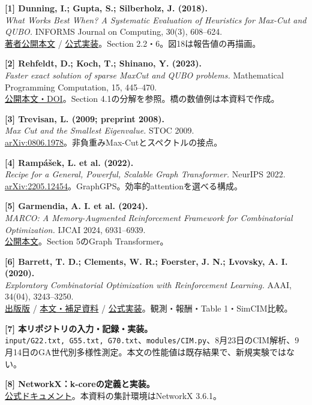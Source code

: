 \newpage
{}
{\small
\noindent\textbf{[1] Dunning, I.; Gupta, S.; Silberholz, J. (2018).}\\
\textit{What Works Best When? A Systematic Evaluation of Heuristics for Max-Cut and QUBO.} INFORMS Journal on Computing, 30(3), 608--624.\\
\href{https://raw.githubusercontent.com/MQLib/MQLib/master/paper/SECM_final.pdf}{著者公開本文} / \href{https://github.com/MQLib/MQLib}{公式実装}。Section 2.2・6。図18は報告値の再描画。

\noindent\textbf{[2] Rehfeldt, D.; Koch, T.; Shinano, Y. (2023).}\\
\textit{Faster exact solution of sparse MaxCut and QUBO problems.} Mathematical Programming Computation, 15, 445--470.\\
\href{https://doi.org/10.1007/s12532-023-00236-6}{公開本文・DOI}。Section 4.1の分解を参照。橋の数値例は本資料で作成。

\noindent\textbf{[3] Trevisan, L. (2009; preprint 2008).}\\
\textit{Max Cut and the Smallest Eigenvalue.} STOC 2009.\\
\href{https://arxiv.org/abs/0806.1978}{arXiv:0806.1978}。非負重みMax-Cutとスペクトルの接点。

\noindent\textbf{[4] Rampášek, L. et al. (2022).}\\
\textit{Recipe for a General, Powerful, Scalable Graph Transformer.} NeurIPS 2022.\\
\href{https://arxiv.org/abs/2205.12454}{arXiv:2205.12454}。GraphGPS。効率的attentionを選べる構成。

\noindent\textbf{[5] Garmendia, A. I. et al. (2024).}\\
\textit{MARCO: A Memory-Augmented Reinforcement Framework for Combinatorial Optimization.} IJCAI 2024, 6931--6939.\\
\href{https://www.ijcai.org/proceedings/2024/0766.pdf}{公開本文}。Section 5のGraph Transformer。

\noindent\textbf{[6] Barrett, T. D.; Clements, W. R.; Foerster, J. N.; Lvovsky, A. I. (2020).}\\
\textit{Exploratory Combinatorial Optimization with Reinforcement Learning.} AAAI, 34(04), 3243--3250.\\
\href{https://ojs.aaai.org/index.php/AAAI/article/view/5723}{出版版} / \href{https://arxiv.org/abs/1909.04063}{本文・補足資料} / \href{https://github.com/tomdbar/eco-dqn}{公式実装}。観測・報酬・Table 1・SimCIM比較。

\noindent\textbf{[7] 本リポジトリの入力・記録・実装。}\\
\texttt{input/G22.txt, G55.txt, G70.txt}、\texttt{modules/CIM.py}、8月23日のCIM解析、9月14日のGA世代別多様性測定。本文の性能値は既存結果で、新規実験ではない。

\noindent\textbf{[8] NetworkX：k-coreの定義と実装。}\\
\href{https://networkx.org/documentation/stable/reference/algorithms/generated/networkx.algorithms.core.k_core.html}{公式ドキュメント}。本資料の集計環境はNetworkX 3.6.1。
}
